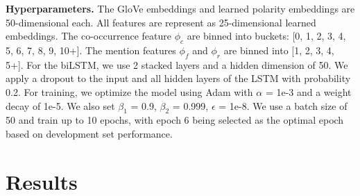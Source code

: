 \documentclass[11pt,a4paper]{article}
\begin{document}
\noindent\textbf{Hyperparameters.}
The GloVe embeddings and learned polarity embeddings are 50-dimensional each.
All features are represent as 25-dimensional learned embeddings. The co-occurrence feature $\phi_c$ are binned into buckets: [0, 1, 2, 3, 4, 5, 6, 7, 8, 9, 10+]. The mention features $\phi_f$ and $\phi_r$ are binned into [1, 2, 3, 4, 5+].
For the biLSTM, we use 2 stacked layers and a hidden dimension of 50. We apply a dropout to the input and all hidden layers of the LSTM with probability 0.2.
For training, we optimize the model using Adam with $\alpha$ = 1e-3 and a weight decay of 1e-5. We also set $\beta_1$ = 0.9, $\beta_2$ = 0.999, $\epsilon$ = 1e-8. We use a batch size of 50 and train up to 10 epochs, with epoch 6 being selected as the optimal epoch based on development set performance.

\section{Results}
\end{document}
